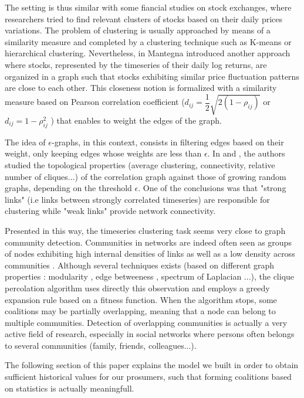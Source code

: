 \documentclass[conference]{IEEEtran}
\begin{document}
The setting is thus similar with some fiancial studies on stock exchanges, where researchers tried to find relevant clusters of stocks based on their daily prices variations. The problem of clustering is usually approached by means of a similarity measure and completed by a clustering technique such as K-means or hierarchical clustering. Nevertheless, in \cite{Mantegna1999} Mantegna introduced another approach where stocks, represented by the timeseries of their daily log returns, are organized in a graph such that stocks exhibiting similar price fluctuation patterns are close to each other. This closeness notion is formalized with a similarity measure based on Pearson correlation coefficient ($ d_{ij} = \dfrac{1}{2}\sqrt{2(1-\rho_{ij})} $ or $ d_{ij} = 1 - \rho_{ij}^{2} $ ) that enables to weight the edges of the graph. 

The idea of $\epsilon$-graphs, in this context, consists in filtering edges based on their weight, only keeping edges whose weights are less than $ \epsilon $. In \cite{Garas2008} and \cite{Onnela2004}, the authors studied the topological properties (average clustering, connectivity, relative number of cliques...) of the correlation graph against those of growing random graphs, depending on the threshold $ \epsilon $. One of the conclusions was that "strong links" (i.e links between strongly correlated timeseries) are responsible for clustering while "weak links" provide network connectivity.

Presented in this way, the timeseries clustering task seems very close to graph community detection. Communities in networks are indeed often seen as groups of nodes exhibiting high internal densities of links as well as a low density across communities \cite{Newmanb}. Although several techniques exists (based on different graph properties : modularity \cite{Newmanb}, edge betweeness \cite{Girvan2002}, spectrum of Laplacian \cite{Newman}...), the clique percolation algorithm \cite{Lancichinetti} uses directly this observation and employs a greedy expansion rule based on a fitness function. When the algorithm stops, some coalitions may be partially overlapping, meaning that a node can belong to multiple communities. Detection of overlapping communities is actually a very active field of research, especially in social networks where persons often belongs to several communities (family, friends, colleagues...).

The following section of this paper explains the model we built in order to obtain sufficient historical values for our prosumers, such that forming coalitions based on statistics is actually meaningfull. 
\end{document}
